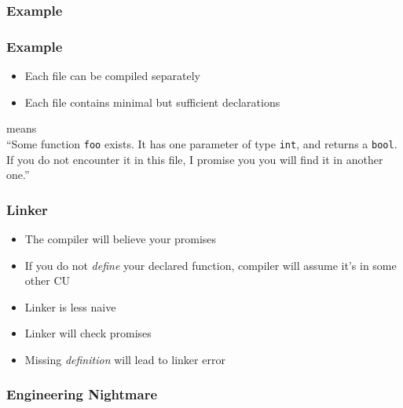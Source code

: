 \documentclass{../ucll-slides}
\begin{document}
\begin{frame}
  \frametitle{Example}
\end{frame}

\begin{frame}
  \frametitle{Example}
  \begin{itemize}
    \item Each file can be compiled separately
    \item Each file contains minimal but sufficient declarations
  \end{itemize}
  \begin{center}
    means \\[7mm]
    ``Some function {\tt foo} exists. It has one parameter of type {\tt int},
    and returns a {\tt bool}. If you do not encounter it in this file,
    I promise you you will find it in another one.''
  \end{center}
\end{frame}

\begin{frame}
  \frametitle{Linker}
  \begin{itemize}
    \item The compiler will believe your promises
    \item If you do not \emph{define} your declared function,
          compiler will assume it's in some other CU
    \item Linker is less naive
    \item Linker will check promises
    \item Missing \emph{definition} will lead to linker error
  \end{itemize}
\end{frame}

\begin{frame}
  \frametitle{Engineering Nightmare}
  \begin{center}
  \end{center}
\end{frame}
\end{document}
